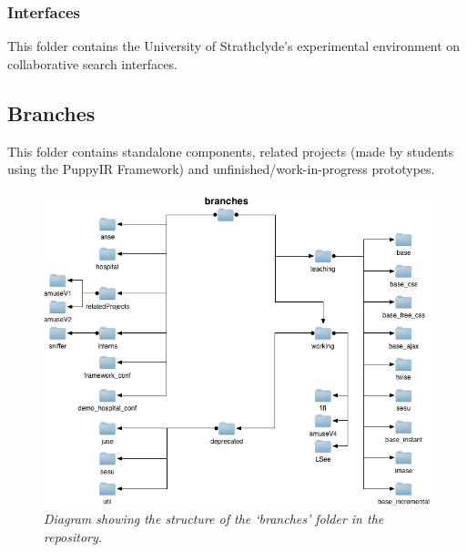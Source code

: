 \documentclass[letterpaper,10pt,english]{sphinxmanual}
\begin{document}
\subsubsection{Interfaces}
\label{repo:interfaces}
This folder contains the University of Strathclyde's experimental environment on collaborative search interfaces.


\subsection{Branches}
\label{repo:branches}
This folder contains standalone components, related projects (made by students using the PuppyIR Framework) and unfinished/work-in-progress prototypes.
\begin{figure}[htbp]
\centering
\capstart

\includegraphics{branches.png}
\caption{\emph{Diagram showing the structure of the `branches' folder in the repository.}}\end{figure}
\end{document}
